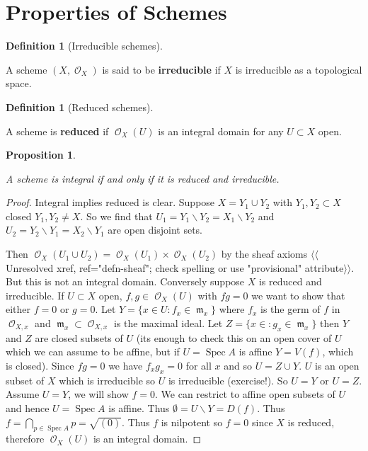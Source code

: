 \documentclass[10pt,]{book}
\newcommand{\terminology}[1]{\textbf{#1}}
\theoremstyle{plain}
\newtheorem{proposition}[theorem]{Proposition}
\theoremstyle{definition}
\newtheorem{definition}[theorem]{Definition}
\numberwithin{equation}{section}
\DeclareMathOperator{\sO}{\mathcal{O}}
\DeclareMathOperator{\fm}{\mathfrak{m}}
\DeclareMathOperator{\Spec}{Spec}
\begin{document}
\section[Properties of Schemes]{Properties of Schemes}\label{sec-props-schemes}
\begin{definition}[Irreducible schemes]\label{definition-7}

            A scheme \((X, \sO_X)\) is said to be \terminology{irreducible} if \(X\) is irreducible as a topological space.
          \end{definition}
\begin{definition}[Reduced schemes]\label{definition-8}

            A scheme is \terminology{reduced} if \(\sO_X(U)\) is an integral domain for any \(U \subset X\) open.
          \end{definition}
\begin{proposition}\label{proposition-3}

            A scheme is integral if and only if it is reduced and irreducible.
          \end{proposition}
\begin{proof}

            Integral implies reduced is clear. \newline{}
            Suppose \(X  = Y_1 \cup Y_2\) with \(Y_1,Y_2 \subset X\) closed \(Y_1,Y_2 \ne X\).
            So we find that \(U_1 = Y_1 \smallsetminus Y_2 = X_1 \smallsetminus Y_2\) and \(U_2 = Y_2 \smallsetminus Y_1 = X_2 \smallsetminus Y_1\) are open disjoint sets.

            Then \(\sO_X(U_1\cup U_2) = \sO_X(U_1) \times \sO_X(U_2)\) by the sheaf axioms {$\langle\langle$Unresolved xref, ref="defn-sheaf"; check spelling or use "provisional" attribute$\rangle\rangle$}.
            But this is not an integral domain.
            Conversely suppose \(X\) is reduced and irreducible.
            If \(U \subset X\) open, \(f,g\in \sO_X(U)\) with \(fg = 0\) we want to show that either \(f=0\) or \(g= 0\).
            Let \(Y  =\{x\in U : f_x \in \fm_x\}\) where \(f_x\) is the germ of \(f\) in \(\sO_{X,x}\) and \(\fm_x\subset \sO_{X,x}\) is the maximal ideal.
            Let \(Z = \{x\in  : g_x \in \fm_x\}\) then \(Y\) and \(Z\) are closed subsets of \(U\) (its enough to check this on an open cover of \(U\) which we can assume to be affine, but if \(U = \Spec A\) is affine \(Y = V(f)\), which is closed).
            Since \(fg = 0\) we have \(f_x g_x = 0\) for all \(x\) and so \(U = Z\cup Y\).
            \(U\) is an open subset of \(X\) which is irreducible so \(U\) is irreducible (exercise!).
            So \(U = Y\) or \(U = Z\).
            Assume \(U = Y\), we will show \(f = 0\).
            We can restrict to affine open subsets of \(U\) and hence \(U =\Spec A\) is affine. Thus \(\emptyset = U \smallsetminus Y = D(f)\).
            Thus \(f = \bigcap_{p\in\Spec A} p = \sqrt{(0)}\).
            Thus \(f\) is nilpotent so \(f = 0\) since \(X\) is reduced, therefore \(\sO_X(U)\) is an integral domain.
          \end{proof}
\end{document}
